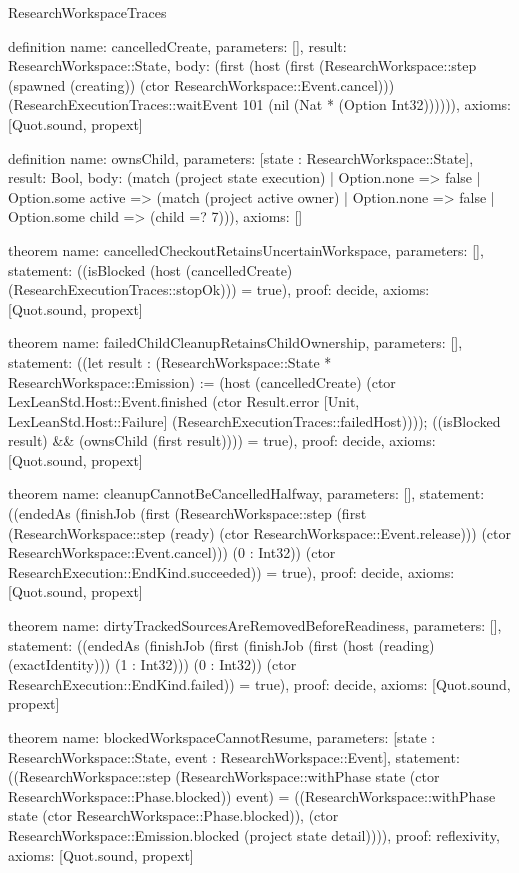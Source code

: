 \begin{lexlean}{ResearchWorkspaceTraces}
\begin{semanticmodule}
definition{
 name: cancelledCreate,
 parameters: [],
 result: ResearchWorkspace::State,
 body: (first (host (first (ResearchWorkspace::step (spawned (creating)) (ctor ResearchWorkspace::Event.cancel))) (ResearchExecutionTraces::waitEvent 101 (nil (Nat * (Option Int32)))))),
 axioms: [Quot.sound, propext]
}

definition{
 name: ownsChild,
 parameters: [state : ResearchWorkspace::State],
 result: Bool,
 body: (match (project state execution) | Option.none => false | Option.some active => (match (project active owner) | Option.none => false | Option.some child => (child =? 7))),
 axioms: []
}

theorem{
 name: cancelledCheckoutRetainsUncertainWorkspace,
 parameters: [],
 statement: ((isBlocked (host (cancelledCreate) (ResearchExecutionTraces::stopOk))) = true),
 proof: decide{},
 axioms: [Quot.sound, propext]
}

theorem{
 name: failedChildCleanupRetainsChildOwnership,
 parameters: [],
 statement: ((let result : (ResearchWorkspace::State * ResearchWorkspace::Emission) := (host (cancelledCreate) (ctor LexLeanStd.Host::Event.finished (ctor Result.error [Unit, LexLeanStd.Host::Failure] (ResearchExecutionTraces::failedHost)))); ((isBlocked result) && (ownsChild (first result)))) = true),
 proof: decide{},
 axioms: [Quot.sound, propext]
}

theorem{
 name: cleanupCannotBeCancelledHalfway,
 parameters: [],
 statement: ((endedAs (finishJob (first (ResearchWorkspace::step (first (ResearchWorkspace::step (ready) (ctor ResearchWorkspace::Event.release))) (ctor ResearchWorkspace::Event.cancel))) (0 : Int32)) (ctor ResearchExecution::EndKind.succeeded)) = true),
 proof: decide{},
 axioms: [Quot.sound, propext]
}

theorem{
 name: dirtyTrackedSourcesAreRemovedBeforeReadiness,
 parameters: [],
 statement: ((endedAs (finishJob (first (finishJob (first (host (reading) (exactIdentity))) (1 : Int32))) (0 : Int32)) (ctor ResearchExecution::EndKind.failed)) = true),
 proof: decide{},
 axioms: [Quot.sound, propext]
}

theorem{
 name: blockedWorkspaceCannotResume,
 parameters: [state : ResearchWorkspace::State, event : ResearchWorkspace::Event],
 statement: ((ResearchWorkspace::step (ResearchWorkspace::withPhase state (ctor ResearchWorkspace::Phase.blocked)) event) = ((ResearchWorkspace::withPhase state (ctor ResearchWorkspace::Phase.blocked)), (ctor ResearchWorkspace::Emission.blocked (project state detail)))),
 proof: reflexivity{},
 axioms: [Quot.sound, propext]
}


\end{semanticmodule}
\end{lexlean}

